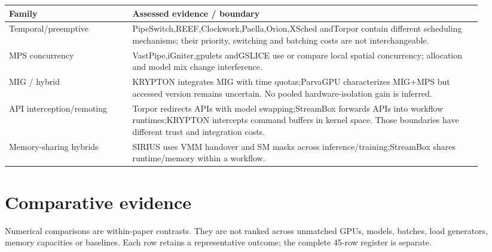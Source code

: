 {\small\begin{longtable}{>{\raggedright\arraybackslash}p{0.24\linewidth}>{\raggedright\arraybackslash}p{0.68\linewidth}}
\toprule
Family & Assessed evidence /\allowbreak{} boundary\\\midrule
\endhead
Temporal/\allowbreak{}preemptive & PipeSwitch,REEF,Clockwork,Paella,Orion,XSched andTorpor contain different scheduling mechanisms; their priority, switching and batching costs are not interchangeable.\\
MPS concurrency & VastPipe,iGniter,gpulets andGSLICE use or compare local spatial concurrency; allocation and model mix change interference.\\
MIG /\allowbreak{} hybrid & KRYPTON integrates MIG with time quotas;ParvaGPU characterizes MIG+MPS but accessed version remains uncertain. No pooled hardware-isolation gain is inferred.\\
API interception/\allowbreak{}remoting & Torpor redirects APIs with model swapping;StreamBox forwards APIs into workflow runtimes;KRYPTON intercepts command buffers in kernel space. Those boundaries have different trust and integration costs.\\
Memory-sharing hybrids & SIRIUS uses VMM handover and SM masks across inference/\allowbreak{}training;StreamBox shares runtime/\allowbreak{}memory within a workflow.\\
\bottomrule
\end{longtable}}


\section{Comparative evidence}

Numerical comparisons are within-paper contrasts. They are not ranked across unmatched GPUs, models, batches, load generators, memory capacities or baselines. Each row retains a representative outcome; the complete 45-row register is separate.



